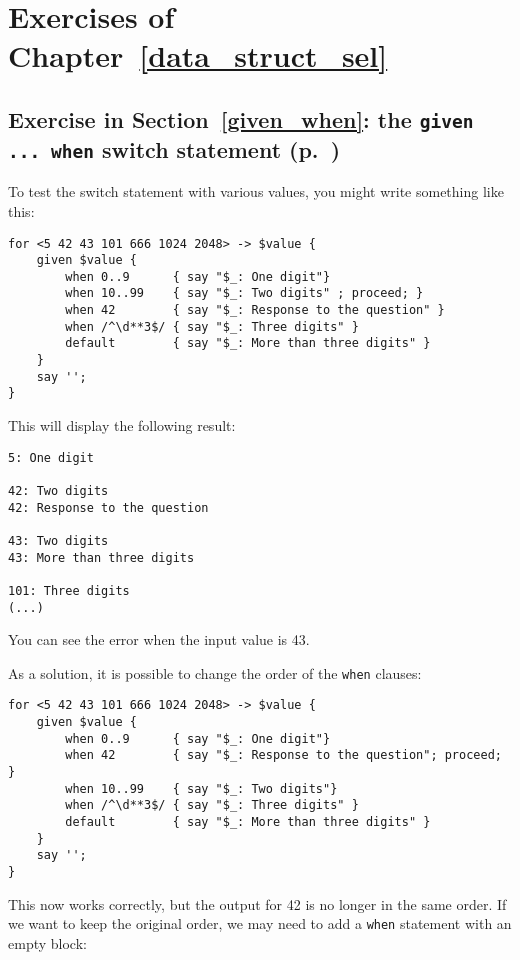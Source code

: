 \section{Exercises of Chapter~\ref{data_struct_sel}}

\subsection{Exercise in Section~\ref{given_when}: the {\tt given ... when} switch statement (p.~\pageref{proceed_ex})}
\label{sol_proceed_ex}

To test the switch statement with various values, you might 
write something like this:

\begin{verbatim}
for <5 42 43 101 666 1024 2048> -> $value {
    given $value {
        when 0..9      { say "$_: One digit"}
        when 10..99    { say "$_: Two digits" ; proceed; }
        when 42        { say "$_: Response to the question" }
        when /^\d**3$/ { say "$_: Three digits" }
        default        { say "$_: More than three digits" }
    }
    say '';
}
\end{verbatim}

This will display the following result:

\begin{verbatim}
5: One digit

42: Two digits
42: Response to the question

43: Two digits
43: More than three digits

101: Three digits
(...)
\end{verbatim}

You can see the error when the input value is 43.

As a solution, it is possible to change the order of the 
{\tt when} clauses:

\begin{verbatim}
for <5 42 43 101 666 1024 2048> -> $value {
    given $value {
        when 0..9      { say "$_: One digit"}
        when 42        { say "$_: Response to the question"; proceed; }
        when 10..99    { say "$_: Two digits"}
        when /^\d**3$/ { say "$_: Three digits" }
        default        { say "$_: More than three digits" }
    }
    say '';
}
\end{verbatim}

This now works correctly, but the output for 42 is no longer 
in the same order. If we want to keep the original order,  
we may need to add a {\tt when} statement with an empty block:

